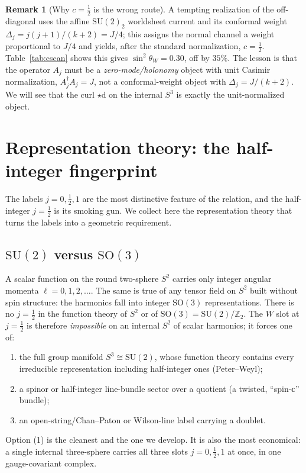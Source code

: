 \documentclass[11pt]{article}
\theoremstyle{plain}
\theoremstyle{definition}
\newtheorem{remark}[theorem]{Remark}
\newcommand{\half}{\tfrac12}
\newcommand{\sinsq}{\sin^{2}\theta_W}
\newcommand{\dd}{\mathrm{d}}
\newcommand{\Z}{\mathbb{Z}}
\newcommand{\SU}{\mathrm{SU}}
\newcommand{\SO}{\mathrm{SO}}
\begin{document}
\begin{remark}[Why $c=\tfrac12$ is the wrong route]
A tempting realization of the off-diagonal uses the affine $\SU(2)_2$
worldsheet current and its conformal weight $\Delta_j=j(j+1)/(k+2)=J/4$;
this assigns the normal channel a weight proportional to $J/4$ and yields,
after the standard normalization, $c=\tfrac12$. Table~\ref{tab:cscan} shows
this gives $\sinsq=0.30$, off by $35\%$. The lesson is that the operator
$A_j$ must be a \emph{zero-mode/holonomy} object with unit Casimir
normalization, $A_j^\dagger A_j=J$, not a conformal-weight object with
$\Delta_j=J/(k+2)$. We will see that the curl $\star\dd$ on the internal
$S^3$ is exactly the unit-normalized object.
\end{remark}

\section{Representation theory: the half-integer fingerprint}
\label{sec:reps}

The labels $j=0,\half,1$ are the most distinctive feature of the relation,
and the half-integer $j=\half$ is its smoking gun. We collect here the
representation theory that turns the labels into a geometric requirement.

\subsection{$\SU(2)$ versus $\SO(3)$}

A scalar function on the round two-sphere $S^2$ carries only integer
angular momenta $\ell=0,1,2,\dots$. The same is true of any tensor field on
$S^2$ built without spin structure: the harmonics fall into integer
$\SO(3)$ representations. There is no $j=\half$ in the function theory of
$S^2$ or of $\SO(3)=\SU(2)/\Z_2$. The $W$ slot at $j=\half$ is therefore
\emph{impossible} on an internal $S^2$ of scalar harmonics; it forces one
of:
\begin{enumerate}
\item the full group manifold $S^3\cong\SU(2)$, whose function theory
contains every irreducible representation including half-integer ones
(Peter--Weyl);
\item a spinor or half-integer line-bundle sector over a quotient (a
twisted, ``spin-$\mathbb{c}$'' bundle);
\item an open-string/Chan--Paton or Wilson-line label carrying a doublet.
\end{enumerate}
Option (1) is the cleanest and the one we develop. It is also the most
economical: a single internal three-sphere carries all three slots
$j=0,\half,1$ at once, in one gauge-covariant complex.
\end{document}
